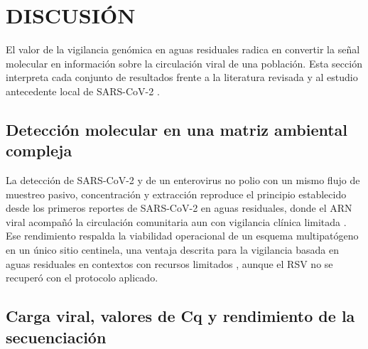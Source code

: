 \section{DISCUSIÓN}

El valor de la vigilancia genómica en aguas residuales radica en convertir la señal molecular en información sobre la circulación viral de una población. Esta sección interpreta cada conjunto de resultados frente a la literatura revisada y al estudio antecedente local de SARS-CoV-2 \cite{MejiaCalle_2024}.

\subsection{Detección molecular en una matriz ambiental compleja}

La detección de SARS-CoV-2 y de un enterovirus no polio con un mismo flujo de muestreo pasivo, concentración y extracción reproduce el principio establecido desde los primeros reportes de SARS-CoV-2 en aguas residuales, donde el ARN viral acompañó la circulación comunitaria aun con vigilancia clínica limitada \cite{Ahmed_2020,Medema_2020}. Ese rendimiento respalda la viabilidad operacional de un esquema multipatógeno en un único sitio centinela, una ventaja descrita para la vigilancia basada en aguas residuales en contextos con recursos limitados \cite{Parkins_2023,Bubba_2023}, aunque el RSV no se recuperó con el protocolo aplicado.

\subsection{Carga viral, valores de Cq y rendimiento de la secuenciación}


